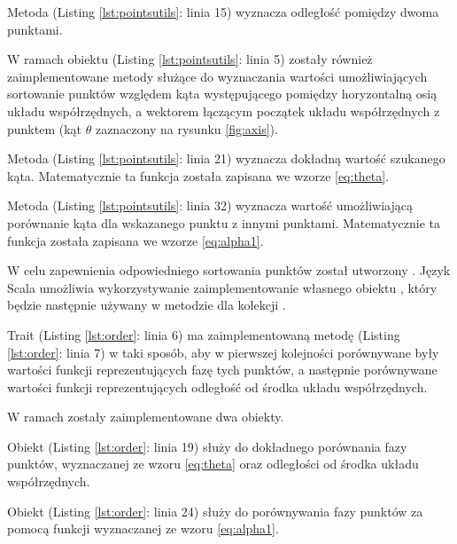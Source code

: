   		Metoda  (Listing \ref{lst:pointsutils}: linia 15) wyznacza odległość pomiędzy dwoma punktami.

		W ramach obiektu  (Listing \ref{lst:pointsutils}: linia 5) zostały również zaimplementowane metody służące do wyznaczania wartości umożliwiających sortowanie punktów względem kąta występującego pomiędzy horyzontalną osią układu współrzędnych, a wektorem łączącym początek układu współrzędnych z punktem (kąt $\theta$ zaznaczony na rysunku \ref{fig:axis}).
		
		Metoda  (Listing \ref{lst:pointsutils}: linia 21) wyznacza dokładną wartość szukanego kąta. Matematycznie ta funkcja została zapisana we wzorze \ref{eq:theta}.
		
		Metoda  (Listing \ref{lst:pointsutils}: linia 32) wyznacza wartość umożliwiającą porównanie kąta dla wskazanego punktu z innymi punktami. Matematycznie ta funkcja została zapisana we wzorze \ref{eq:alpha1}.
   		
   		
   		\newpage
   		
   		W celu zapewnienia odpowiedniego sortowania punktów został utworzony . Język Scala umożliwia wykorzystywanie zaimplementowanie własnego obiektu , który będzie następnie używany w metodzie  dla kolekcji .
   		
   	 	Trait  (Listing \ref{lst:order}: linia 6) ma zaimplementowaną metodę  (Listing \ref{lst:order}: linia 7) w taki sposób, aby w pierwszej kolejności porównywane były wartości funkcji reprezentujących fazę tych punktów, a następnie porównywane wartości funkcji reprezentujących odległość od środka układu współrzędnych.
   	 	
   	 	W ramach  zostały zaimplementowane dwa obiekty.
   	 	
   	 	Obiekt  (Listing \ref{lst:order}: linia 19) służy do dokładnego porównania fazy punktów, wyznaczanej ze wzoru \ref{eq:theta} oraz odległości od środka układu współrzędnych. 
   	 	
   	 	Obiekt  (Listing \ref{lst:order}: linia 24) służy do porównywania fazy punktów za pomocą funkcji wyznaczanej ze wzoru \ref{eq:alpha1}.
   		
